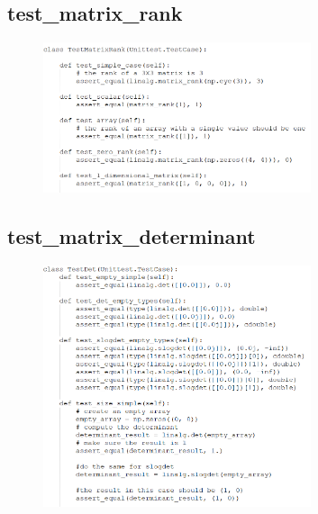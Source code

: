 \documentclass[a4paper,11pt]{article}
\begin{document}
\subsection{test\_matrix\_rank}	
\begin{figure}[h]
	\centering
	\includegraphics[width=0.70\textwidth]{snippets/rank/1.PNG}
\end{figure}

\subsection{test\_matrix\_determinant}	
\begin{figure}[h]
	\centering
	\includegraphics[width=0.70\textwidth]{snippets/Det/1.PNG}
\end{figure}
\end{document}
